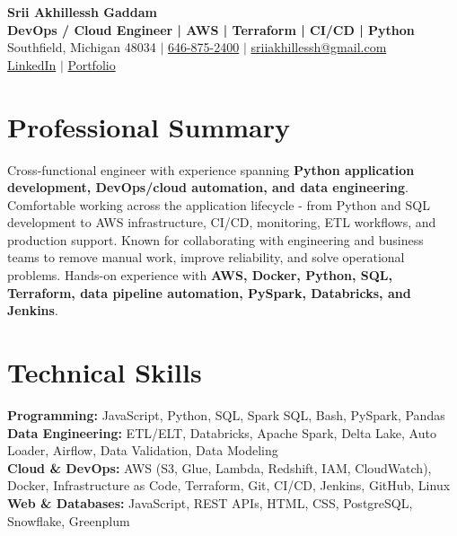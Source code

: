 \documentclass[letterpaper,10pt]{article}
\begin{document}
\fontsize{9.35pt}{10.45pt}\selectfont

\begin{center}
    {\LARGE \textbf{Srii Akhillessh Gaddam}} \\[-1pt]
    \textbf{DevOps / Cloud Engineer | AWS | Terraform | CI/CD | Python} \\[2pt]
    Southfield, Michigan 48034 $|$
    \href{tel:6468752400}{646-875-2400} $|$
    \href{mailto:sriiakhillessh@gmail.com}{sriiakhillessh@gmail.com} \\[1pt]
    \href{https://www.linkedin.com/in/srii-akhiilessh-gaddam-b48668191/}{LinkedIn} $|$
    \href{https://sriiakhillesshg.github.io/portfolio/}{Portfolio}
\end{center}
\vspace{-8pt}

\section{Professional Summary}
\small{Cross-functional engineer with experience spanning \textbf{Python application development, DevOps/cloud automation, and data engineering}. Comfortable working across the application lifecycle - from Python and SQL development to AWS infrastructure, CI/CD, monitoring, ETL workflows, and production support. Known for collaborating with engineering and business teams to remove manual work, improve reliability, and solve operational problems. Hands-on experience with \textbf{AWS, Docker, Python, SQL, Terraform, data pipeline automation, PySpark, Databricks, and Jenkins}.}

\section{Technical Skills}
\small{
\textbf{Programming:} JavaScript, Python, SQL, Spark SQL, Bash, PySpark, Pandas \\
\textbf{Data Engineering:} ETL/ELT, Databricks, Apache Spark, Delta Lake, Auto Loader, Airflow, Data Validation, Data Modeling \\
\textbf{Cloud \& DevOps:} AWS (S3, Glue, Lambda, Redshift, IAM, CloudWatch), Docker, Infrastructure as Code, Terraform, Git, CI/CD, Jenkins, GitHub, Linux \\
\textbf{Web \& Databases:} JavaScript, REST APIs, HTML, CSS, PostgreSQL, Snowflake, Greenplum
}
\end{document}
